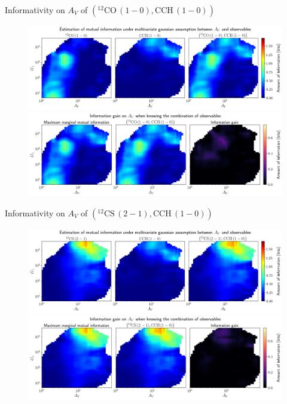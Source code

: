 \documentclass{beamer}
\begin{document}
\begin{frame}{Informativity on $A_V$ of $\left(\mathrm{^{12}CO\,(1-0)},\mathrm{CCH\,(1-0)}\right)$}
    \begin{figure}
        \centering
        \includegraphics[width=0.95\linewidth]{../linearinfo/av__12co10_cch10_linearinfo.png}
        \vfill
        \includegraphics[width=0.95\linewidth]{../linearinfo/av__12co10_cch10_linearinfo_gain.png}
    \end{figure}
\end{frame}

\begin{frame}{Informativity on $A_V$ of $\left(\mathrm{^{12}CS\,(2-1)},\mathrm{CCH\,(1-0)}\right)$}
    \begin{figure}
        \centering
        \includegraphics[width=0.95\linewidth]{../linearinfo/av__12cs21_cch10_linearinfo.png}
        \vfill
        \includegraphics[width=0.95\linewidth]{../linearinfo/av__12cs21_cch10_linearinfo_gain.png}
    \end{figure}
\end{frame}
\end{document}
